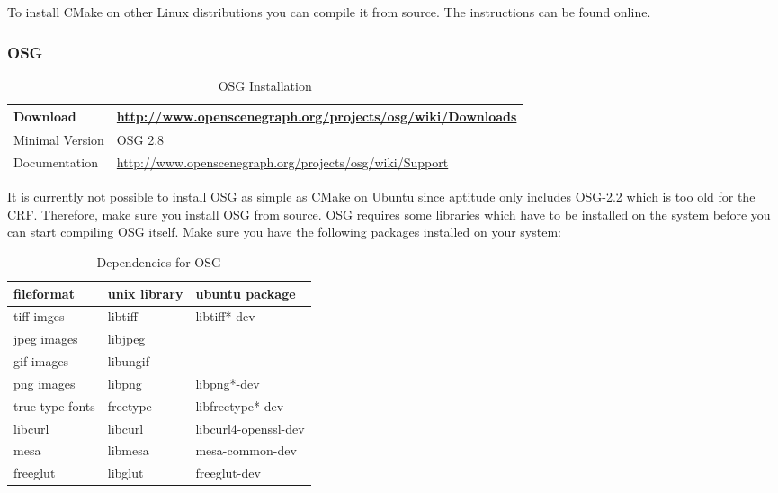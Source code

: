 \begin{lstlisting}[language=bash,caption={Install cmake on Ubuntu}]
% sudo apt-get install cmake
\end{lstlisting}

To install CMake on other Linux distributions you can compile it from source. The instructions can be found online.

\subsubsection{OSG}
\begin{table}[H]
	\centering
	\begin{tabular}{|p{}|p{}|}
		\hline Download & \href{http://www.openscenegraph.org/projects/osg/wiki/Downloads}{http://www.openscenegraph.org/projects/osg/wiki/Downloads} \\
		\hline Minimal Version & OSG 2.8 \\
		\hline Documentation & \href{http://www.openscenegraph.org/projects/osg/wiki/Support}{http://www.openscenegraph.org/projects/osg/wiki/Support} \\
		\hline
	\end{tabular}
	\caption{OSG Installation}
\end{table}

It is currently not possible to install OSG as simple as CMake on Ubuntu since aptitude only includes OSG-2.2 which is too old for the CRF. Therefore, make sure you install OSG from source. 
OSG requires some libraries which have to be installed on the system before you can start compiling OSG itself. Make sure you have the following packages installed on your system:

\begin{table}[H]
\centering
\begin{tabular}{|l|l|l|}
\hline \bfseries fileformat & \bfseries unix library  & \bfseries ubuntu package \\ 
\hline
\hline  tiff imges & libtiff & libtiff*-dev \\
\hline  jpeg images & libjpeg &  \\
\hline  gif images & libungif & \\
\hline  png images & libpng & libpng*-dev \\
\hline  true type fonts & freetype & libfreetype*-dev \\
\hline  libcurl & libcurl & libcurl4-openssl-dev \\
\hline  mesa & libmesa & mesa-common-dev \\
\hline  freeglut & libglut & freeglut-dev \\
\hline
\end{tabular} 
\caption{Dependencies for OSG}
\end{table}

